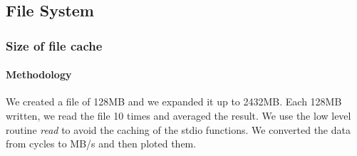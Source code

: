 \newpage
\subsection{File System}

\subsubsection{Size of file cache}

%
%



\paragraph{Methodology}
We created a file of 128MB and we expanded it up to 2432MB.
Each 128MB written, we read the file 10 times and averaged the result.
We use the low level routine \emph{read} to avoid the caching of the stdio
functions.
We converted the data from cycles to MB/s and then ploted them.

